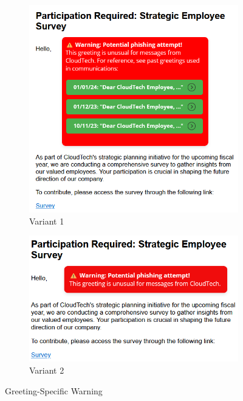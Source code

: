 \documentclass[
  a4paper,  %
  twoside,  %
  bibliography=totoc,
  headsepline,
  cleardoublepage=empty,
  parskip=half,
  draft=false
]{scrbook}
\begin{document}
\begin{figure} [h]
\centering
\begin{subfigure}{.5\textwidth}
  \centering
  \includegraphics[width=.9\linewidth]{figures/greeting1.png}
  \caption{Variant 1}
  \label{fig:greeting1}
\end{subfigure}%
\begin{subfigure}{.5\textwidth}
  \centering
  \includegraphics[width=.9\linewidth]{figures/greeting2.png}
  \caption{Variant 2}
  \label{fig:greeting2}
\end{subfigure}
\caption{Greeting-Specific Warning}
\label{fig:greeting}
\end{figure}
\end{document}
